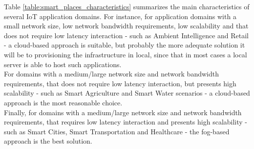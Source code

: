 Table \ref{table:smart_places_characteristics} summarizes the main characteristics of several
\gls{IoT} application domains. For instance, for application domains with a small network size, low network
bandwidth requirements, low scalability and that does not require low latency interaction - such as Ambient
Intelligence and Retail - a cloud-based approach is suitable, but probably the more adequate
solution it will be to provisioning the infrastructure in local, since that in most cases a local
server is able to host such applications.\\

For domains with a medium/large network size and network bandwidth requirements, that does not require
low latency interaction, but presents high scalability - such as Smart Agriculture and Smart Water
scenarios - a cloud-based approach is the most reasonable choice.\\

Finally, for domains with a medium/large network size and network bandwidth requirements, that requires
low latency interaction and presents high scalability - such as Smart Cities, Smart Transportation and
Healthcare - the fog-based approach is the best solution.
